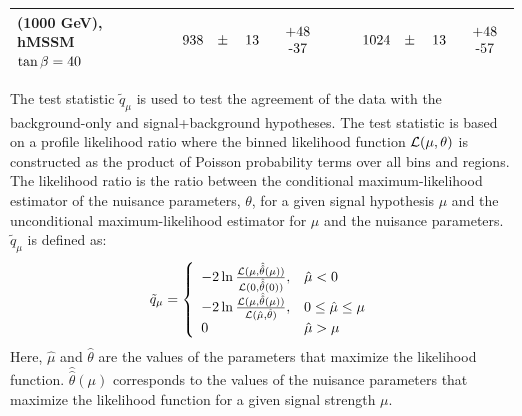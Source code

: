 \begin{table}
\begin{center}
{\begin{tabular}{l|r|r}
			\Hpm (1000 GeV), hMSSM $\tan\beta=40$ &   $\phantom{0000}938\phantom{0.}\pm\phantom{00}13\phantom{0.}\phantom{0}\begin{tabular}{c}+48 \\-37\end{tabular}$ & $\phantom{0000}1024\phantom{0.}\pm\phantom{00}13\phantom{0.}\phantom{0}\begin{tabular}{c}+48 \\-57\end{tabular}$ \\
			\hline
			\end{tabular}}
			\end{center}
		\end{table}

		The test statistic $\tilde{q}_{\mu}$ \cite{test-statistic} is used to test the agreement of the data with the background-only and signal+background hypotheses. The test statistic is based on a profile likelihood ratio where the binned likelihood function $\cal{L}(\mu,\theta)$ is constructed as the product of Poisson probability terms over all bins and regions. The likelihood ratio is the ratio between the conditional maximum-likelihood estimator of the nuisance parameters, $\theta$, for a given signal hypothesis $\mu$ and the unconditional maximum-likelihood estimator for $\mu$ and the nuisance parameters. $\tilde{q}_{\mu}$ is defined as:
		\begin{equation}
		\tilde{q}_{\mu} = \left\{
		\begin{array}{ll}
		-2\ln\frac{{\cal L}(\mu, \hat{\hat{\theta}}(\mu))}{{\cal L}(0, \hat{\hat{\theta}}(0))}, & \hat{\mu} < 0 \\
		-2\ln\frac{{\cal L}(\mu, \hat{\hat{\theta}}(\mu))}{{\cal L}(\hat{\mu}, \hat{\theta})}, & 0 \leq \hat{\mu} \leq \mu \\
		0 & \hat{\mu} > \mu 
		\end{array}
		\right.
		\end{equation}
		Here, $\hat{\mu}$ and $\hat{\theta}$ are the values of the parameters that maximize the likelihood function. $\hat{\hat{\theta}}(\mu)$ corresponds to the values of the nuisance parameters that maximize the likelihood function for a given signal strength $\mu$.

